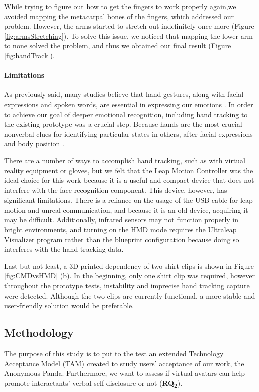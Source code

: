 While trying to figure out how to get the fingers to work properly again,we avoided mapping the metacarpal bones of the fingers, which addressed our problem. However, the arms started to stretch out indefinitely once more (Figure \ref{fig:armsStretching}). To solve this issue, we noticed that mapping the lower arm to none solved the problem, and thus we obtained our final result (Figure \ref{fig:handTrack}).

\paragraph{Limitations}
As previously said, many studies believe that hand gestures, along with facial expressions and spoken words, are essential in expressing our emotions \cite{ARJ20, WAX97, REI22}. In order to achieve our goal of deeper emotional recognition, including hand tracking to the existing prototype was a crucial step. Because hands are the most crucial nonverbal clues for identifying particular states in others, after facial expressions and body position \cite{WAX97, REI22}.

There are a number of ways to accomplish hand tracking, such as with virtual reality equipment or gloves, but we felt that the Leap Motion Controller was the ideal choice for this work because it is a useful and compact device that does not interfere with the face recognition component. This device, however, has significant limitations. There is a reliance on the usage of the USB cable for leap motion and unreal communication, and because it is an old device, acquiring it may be difficult. Additionally, infrared sensors may not function properly in bright environments, and turning on the HMD mode requires the Ultraleap Visualizer program rather than the blueprint configuration because doing so interferes with the hand tracking data.

Last but not least, a 3D-printed dependency of two shirt clips is shown in Figure \ref{fig:CMDvsHMD} (b). In the beginning, only one shirt clip was required, however throughout the prototype tests, instability and imprecise hand tracking capture were detected. Although the two clips are currently functional, a more stable and user-friendly solution would be preferable.

\subsection{Methodology}
The purpose of this study is to put to the test an extended Technology Acceptance Model (TAM) created to study users' acceptance of our work, the Anonymous Panda. Furthermore, we want to assess if virtual avatars can help promote interactants' verbal self-disclosure or not (\textbf{RQ\textsubscript{2}}).

